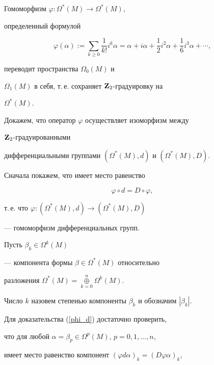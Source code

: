 Гомоморфизм $\varphi:\Omega^*(M)\to \Omega^*(M)$,


определенный формулой


$$


\varphi(\alpha):=\sum_{k\ge0}\frac1{k!} i^k\alpha=


\alpha+i\alpha+\frac12i^2\alpha+\frac16i^3\alpha+\dotsb,


$$


переводит пространства $\Omega_0(M)$ и


$\Omega_1(M)$ в себя, т.\,е. сохраняет ${\bold Z}_2$-гра\-ду\-и\-ров\-ку на


$\Omega^*(M)$.





Докажем, что оператор $\varphi$ осуществляет изоморфизм между


${\bold Z}_2$-градуированными


дифференциальными группами $(\Omega^*(M),d)$ и $(\Omega^*(M),D)$.





Сначала покажем, что имеет место равенство


\begin{equation}


\label{phi_d}


\varphi\circ d=D\circ \varphi,


\end{equation}


т.\,е. что $\varphi:(\Omega^*(M),d)\to (\Omega^*(M),D)$


--- гомоморфизм дифференциальных групп.





Пусть  $\beta_k\in\Omega^k(M)$


--- компонента формы $\beta\in\Omega^*(M)$ относительно


разложения $\Omega^*(M)=\mathop{\oplus}\limits^n_{k=0}\Omega^k(M)$.


Число $k$ назовем степенью компоненты $\beta_k$ и обозначим $|\beta_k|$.





Для доказательства (\ref{phi_d}) достаточно проверить,


что для любой $\alpha=\beta_p\in\Omega^p(M)$, $p=0,1,\dotsc,n$,


имеет место равенство компонент $(\varphi d\alpha)_k=(D\varphi\alpha)_k$,


